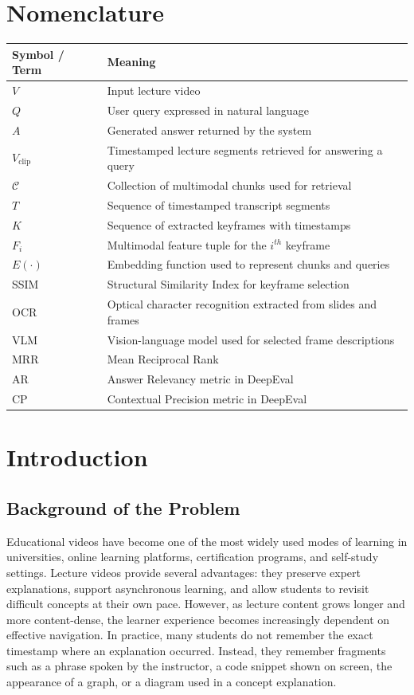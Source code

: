 \documentclass[12pt,a4paper,oneside]{report}
\begin{document}
\chapter*{Nomenclature}
\begin{longtable}{p{}p{}}
\toprule
\textbf{Symbol / Term} & \textbf{Meaning} \\
\midrule
$V$ & Input lecture video \\
$Q$ & User query expressed in natural language \\
$A$ & Generated answer returned by the system \\
$V_{\text{clip}}$ & Timestamped lecture segments retrieved for answering a query \\
$\mathcal{C}$ & Collection of multimodal chunks used for retrieval \\
$T$ & Sequence of timestamped transcript segments \\
$K$ & Sequence of extracted keyframes with timestamps \\
$F_i$ & Multimodal feature tuple for the $i^{th}$ keyframe \\
$E(\cdot)$ & Embedding function used to represent chunks and queries \\
SSIM & Structural Similarity Index for keyframe selection \\
OCR & Optical character recognition extracted from slides and frames \\
VLM & Vision-language model used for selected frame descriptions \\
MRR & Mean Reciprocal Rank \\
AR & Answer Relevancy metric in DeepEval \\
CP & Contextual Precision metric in DeepEval \\
\bottomrule
\end{longtable}

\clearpage
{}

\chapter{Introduction}

\section{Background of the Problem}
Educational videos have become one of the most widely used modes of learning in universities, online learning platforms, certification programs, and self-study settings. Lecture videos provide several advantages: they preserve expert explanations, support asynchronous learning, and allow students to revisit difficult concepts at their own pace. However, as lecture content grows longer and more content-dense, the learner experience becomes increasingly dependent on effective navigation. In practice, many students do not remember the exact timestamp where an explanation occurred. Instead, they remember fragments such as a phrase spoken by the instructor, a code snippet shown on screen, the appearance of a graph, or a diagram used in a concept explanation.
\end{document}

